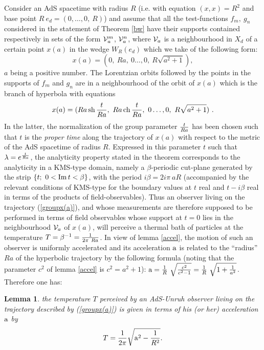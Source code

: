 \documentclass[a4paper,a4paper]{article}
\newtheorem{lemma}{Lemma}[section]
\def\Im{{\rm Im\,}}
\def\ch{{\rm ch\,}}
\def\sh{{\rm sh\,}}
\begin{document}
Consider an AdS spacetime with radius $R$ (i.e.
with equation $(x,x) = R^2$ and base point $R\ e_d =(0,\ldots,0,\ R)$)
and assume that all the test-functions
$f_m,\ g_n$ considered in the statement of Theorem \ref{bw}
have their supports contained respectively in sets of the form
${\cal V}_a^m$,
${\cal V}_a^n$, where ${\cal V}_a$ is a neighbourhood in $X_d$
of a certain point $x(a)$ in the wedge $W_R(e_d)$
which we take of the following form:
\begin{equation}
x(a) = (0,\ R a,\ 0\ldots,0,\ R \sqrt {a^2+1}),
\label{x(a)} \end{equation}
$a$ being a positive number.
The Lorentzian orbits followed by the points in the supports of
$f_m$ and $g_n$ are in a neighbourhood of the orbit of $x(a)$
which is the branch of hyperbola with equations
\begin{equation}
[e^{t\over Ra}]x(a) = (Ra\,\sh {t\over Ra},\
Ra\,\ch {t\over Ra},\
0\ldots,0,\ R \sqrt {a^2+1})\ .
\label{groupx(a)}\end{equation}
In the latter, the normalization of the group parameter $t\over Ra$
has been chosen such that $t$ is the
{\sl proper time} along the trajectory of $x(a)$ with respect
to the metric of the AdS spacetime of radius $R$.
Expressed in this parameter $t$ such that
$\lambda = e^{t\over Ra}$,
the analyticity property stated in the theorem corresponds
to the analyticity in a KMS-type domain, namely a
$\beta$-periodic cut-plane generated by
the strip $\{t; \ 0<\Im t< \beta\}$,
with the period $i\beta = 2i\pi \ aR$ (accompanied by the
relevant conditions of KMS-type for the
boundary values at $t$ real and $t-i\beta$ real
in terms of the products of field-observables).
Thus an
observer living on the trajectory (\ref{groupx(a)}),
and whose measurements are therefore supposed to be performed
in terms of field observables whose support
at $t=0$ lies in the
neighbourhood ${\cal V}_a$ of $x(a)$,
will perceive a thermal bath of particles
at the temperature $T= \beta^{-1} = {1\over 2\pi \ Ra}$.
In view of lemma \ref{accel}, the motion of such an observer is
uniformly accelerated and its acceleration $\rm a$ is related
to the ``radius'' $Ra$ of the hyperbolic trajectory
by the following formula (noting that the parameter $c^2$ of
lemma \ref{accel} is $c^2= a^2 +1$):
${\rm a} =
{1\over R}\  \sqrt {c^2\over c^2 -1}
= {1\over R}\  \sqrt {1 + {1\over a^2}}$.
Therefore one has:
\begin{lemma}
\label{temperature}
the temperature $T$ perceived by an AdS-Unruh observer living
on the trajectory described by  (\ref{groupx(a)}) is given
in terms of his (or her) acceleration $\rm a$
by
\begin{equation}
T={1\over 2\pi} \sqrt {{\rm a}^2 -{1\over R^2}}.
\label{tempeq}\end{equation}
\end{lemma}
\end{document}

